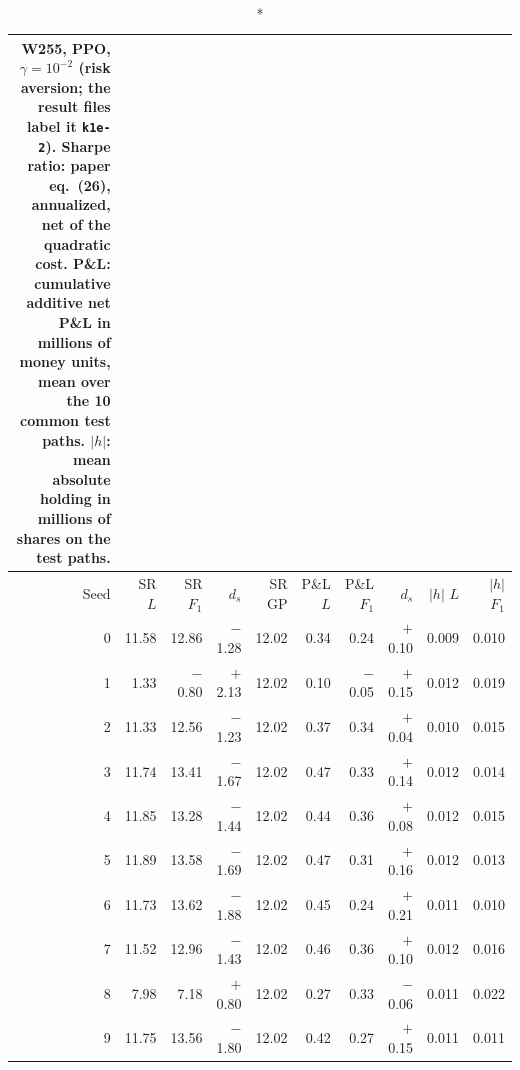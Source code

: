 \begin{longtable}{@{}rrrrrrrrrr@{}}
\caption*{\small W255, PPO, $\gamma = 10^{-2}$ (risk aversion; the result files label it \texttt{k1e-2}). Sharpe ratio: paper eq.\ (26), annualized, net of the quadratic cost. P\&L: cumulative additive net P\&L in millions of money units, mean over the 10 common test paths. $|h|$: mean absolute holding in millions of shares on the test paths.}\\
\toprule
Seed & SR $L$ & SR $F_1$ & $d_s$ & SR GP & P\&L $L$ & P\&L $F_1$ & $d_s$ & $|h|$ $L$ & $|h|$ $F_1$\\ \midrule\endhead
0 & 11.58 & 12.86 & $-$1.28 & 12.02 & 0.34 & 0.24 & $+$0.10 & 0.009 & 0.010\\
1 & 1.33 & $-$0.80 & $+$2.13 & 12.02 & 0.10 & $-$0.05 & $+$0.15 & 0.012 & 0.019\\
2 & 11.33 & 12.56 & $-$1.23 & 12.02 & 0.37 & 0.34 & $+$0.04 & 0.010 & 0.015\\
3 & 11.74 & 13.41 & $-$1.67 & 12.02 & 0.47 & 0.33 & $+$0.14 & 0.012 & 0.014\\
4 & 11.85 & 13.28 & $-$1.44 & 12.02 & 0.44 & 0.36 & $+$0.08 & 0.012 & 0.015\\
5 & 11.89 & 13.58 & $-$1.69 & 12.02 & 0.47 & 0.31 & $+$0.16 & 0.012 & 0.013\\
6 & 11.73 & 13.62 & $-$1.88 & 12.02 & 0.45 & 0.24 & $+$0.21 & 0.011 & 0.010\\
7 & 11.52 & 12.96 & $-$1.43 & 12.02 & 0.46 & 0.36 & $+$0.10 & 0.012 & 0.016\\
8 & 7.98 & 7.18 & $+$0.80 & 12.02 & 0.27 & 0.33 & $-$0.06 & 0.011 & 0.022\\
9 & 11.75 & 13.56 & $-$1.80 & 12.02 & 0.42 & 0.27 & $+$0.15 & 0.011 & 0.011\\
\bottomrule\end{longtable}
